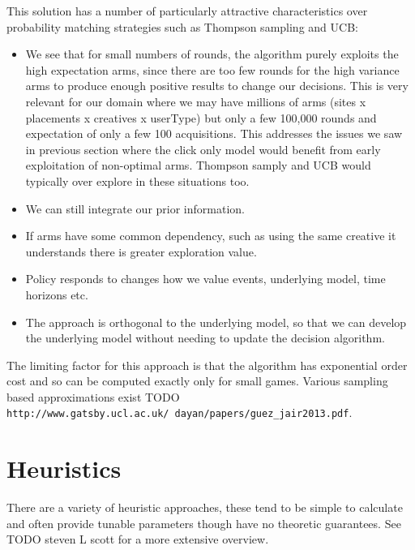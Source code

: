 \documentclass[11pt,a4,singlespacing,titlepagenumber=on]{scrreprt}
\numberwithin{equation}{chapter} %
\theoremstyle{remark}
\begin{document}
This solution has a number of particularly attractive characteristics over probability matching strategies such as Thompson sampling and UCB:
\begin{itemize}
	\item We see that for small numbers of rounds, the algorithm purely exploits the high expectation arms, since there are too few rounds for the high variance arms to produce enough positive results to change our decisions. This is very relevant for our domain where we may have millions of arms (sites x placements x creatives x userType) but only a few 100,000 rounds and expectation of only a few 100 acquisitions. This addresses the issues we saw in previous section where the click only model would benefit from early exploitation of non-optimal arms. Thompson samply and UCB would typically over explore in these situations too.
	\item We can still integrate our prior information.
	\item If arms have some common dependency, such as using the same creative it understands there is greater exploration value.
	\item Policy responds to changes how we value events, underlying model, time horizons etc.
	\item The approach is orthogonal to the underlying model, so that we can develop the underlying model without needing to update the decision algorithm.
\end{itemize}

The limiting factor for this approach is that the algorithm has exponential order cost and so can be computed exactly only for small games. Various sampling based approximations exist TODO \texttt{http://www.gatsby.ucl.ac.uk/~dayan/papers/guez\_jair2013.pdf}. 

\section{ Heuristics } \label{sec:heuristics}

There are a variety of heuristic approaches, these tend to be simple to calculate and often provide tunable parameters though have no theoretic guarantees. See TODO steven L scott for a more extensive overview.
\end{document}
